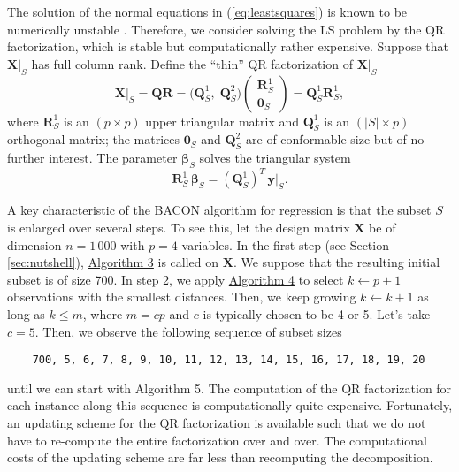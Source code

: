\documentclass[a4paper,oneside,11pt,DIV=12]{scrartcl}
\begin{document}
The solution of the normal equations in (\ref{eq:leastsquares}) is known to be numerically unstable \citep[][Chap. 5.3]{golub_loan_1996}. Therefore, we consider solving the LS problem by the QR factorization, which is stable but computationally rather expensive. Suppose that $\bm X\vert_S$ has full column rank. Define the ``thin'' QR factorization of $\bm X \vert_{S}$ \citep[][Chap. 5.3]{golub_loan_1996} 
\begin{equation}\label{eq:reg_qr1}
	\bm X \vert_S = \bm Q \bm R =  \big( \bm Q_{S}^1, \; \bm Q_{S}^2 \big) \left(\begin{matrix} \bm R_{S}^1 \\ \bm 0_S \end{matrix}\right) = \bm Q_{S}^1 \bm R_{S}^1,
\end{equation}
\noindent where $\bm R_{S}^1$ is an $(p \times p)$ upper triangular matrix and $\bm Q_{S}^1$ is an $(\vert S \vert \times p)$ orthogonal matrix; the matrices $\bm 0_{S}$ and $\bm Q_{S}^2$ are of conformable size but of no further interest. The parameter $\bm \beta_S$ solves the triangular system   
\begin{equation}
	\bm R_{S}^1 \, \bm \beta_S  = (\bm Q_{S}^1)^T \, \bm y \vert_S.
\end{equation}

A key characteristic of the BACON algorithm for regression is that the subset $S$ is enlarged over several steps. To see this, let the design matrix $\bm X$ be of dimension $n=1\,000$ with $p=4$ variables. In the first step (see Section \ref{sec:nutshell}), \hyperlink{alg:alg3}{Algorithm 3} is called on $\bm X$. We suppose that the resulting initial subset is of size 700. In step 2, we apply \hyperlink{alg:alg4}{Algorithm 4} to select $k \gets p+1$ observations with the smallest distances. Then, we keep growing $k \gets k + 1$ as long as $k \leq m$, where $m=cp$ and $c$ is typically chosen to be 4 or 5. Let's take $c=5$. Then, we observe the following sequence of subset sizes  
\begin{verbatim}
    700, 5, 6, 7, 8, 9, 10, 11, 12, 13, 14, 15, 16, 17, 18, 19, 20 
\end{verbatim}
\noindent until we can start with Algorithm 5. The computation of the QR factorization for each instance along this sequence is computationally quite expensive. Fortunately, an updating scheme for the QR factorization is available such that we do not have to re-compute the entire factorization over and over. The computational costs of the updating scheme are far less than recomputing the decomposition.
\end{document}
